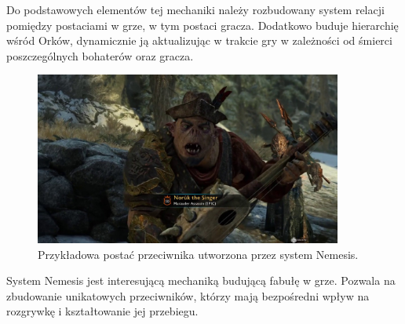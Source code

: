 Do podstawowych elementów tej mechaniki należy rozbudowany system relacji pomiędzy postaciami w grze, w tym postaci
gracza. Dodatkowo buduje hierarchię wśród Orków, dynamicznie ją aktualizując w trakcie gry w zależności od śmierci
poszczególnych bohaterów oraz gracza.

\begin{figure}[h!]
    \centering
    \includegraphics[width=0.9\textwidth]{images/system_nemesis.png}
    \caption{Przykładowa postać przeciwnika utworzona przez system Nemesis.}
\end{figure}

System Nemesis jest interesującą mechaniką budującą fabułę w grze. Pozwala na zbudowanie unikatowych przeciwników,
którzy mają bezpośredni wpływ na rozgrywkę i kształtowanie jej przebiegu.